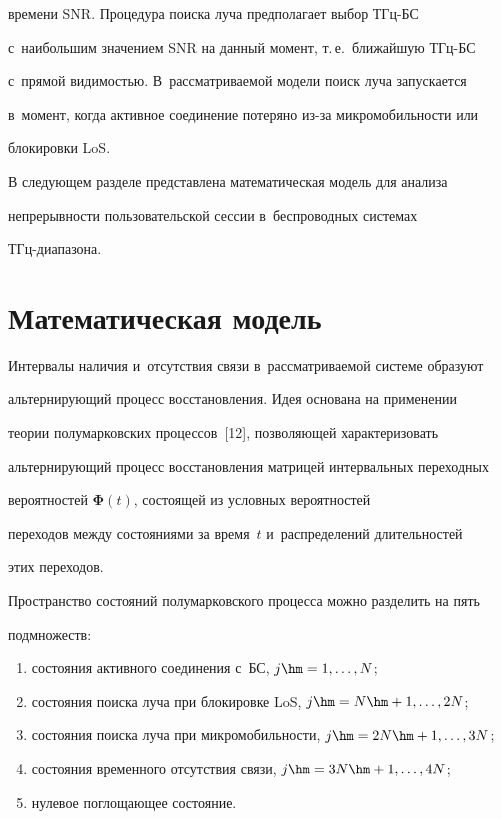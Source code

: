 времени SNR. Процедура поиска луча предполагает выбор ТГц-БС 


с~наибольшим значением SNR на данный момент, т.\,е.\ ближайшую ТГц-БС 


с~прямой ви\-ди\-мостью. В~рассматриваемой модели поиск луча запускается 


в~момент, когда активное со\-еди\-не\-ние потеряно из-за микромобильности или 


блокировки LoS.


  


  В следующем разделе представлена математическая модель для анализа 


не\-пре\-рыв\-ности пользовательской сессии в~беспроводных сис\-те\-мах 


ТГц-диа\-па\-зона.





\section{Математическая модель}


  


  Интервалы наличия и~отсутствия связи в~рассматриваемой системе образуют 


альтернирующий процесс восстановления. Идея основана на применении 


теории полумарковских процессов~[12], поз\-во\-ля\-ющей характеризовать 


альтернирующий процесс восстановления мат\-ри\-цей интервальных переходных 


вероятностей $\boldsymbol{\Phi}(t)$, со\-сто\-ящей из условных вероятностей 


переходов меж\-ду со\-сто\-яни\-ями за время~$t$ и~распределений длительностей 


этих переходов.


  


  Пространство состояний полумарковского процесса мож\-но разделить на пять 


подмножеств: 


\begin{enumerate}[(1)]


\item со\-сто\-яния активного со\-еди\-не\-ния с~БС, $j\hm= 1,\ldots , N$; 


\item со\-сто\-яния поиска луча при блокировке LoS, $j\hm= N\hm+1, \ldots , 2N$; 


\item со\-сто\-яния поиска луча при микромобильности, $j\hm= 2N\hm+ 1, \ldots , 


3N$; 


\item со\-сто\-яния временного отсутствия связи, $j\hm= 3N\hm+1, \ldots , 4N$; 


\item нулевое по\-гло\-ща\-ющее со\-сто\-яние.


\end{enumerate}


